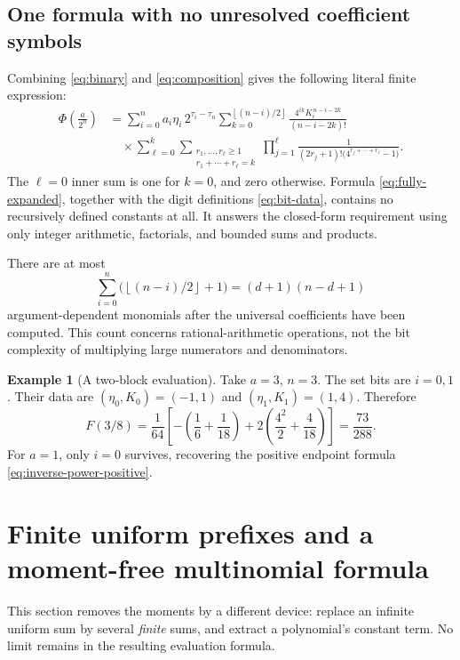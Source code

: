 \documentclass[11pt,a4paper]{article}
\theoremstyle{definition}
\newtheorem{example}[theorem]{Example}
\theoremstyle{remark}
\newcommand{\floor}[1]{\left\lfloor #1\right\rfloor}
\begin{document}
\subsection{One formula with no unresolved coefficient symbols}
Combining \eqref{eq:binary} and \eqref{eq:composition} gives the following literal
finite expression:
\begin{equation}
 \boxed{\begin{aligned}
 \Phi\!\left(\frac a{2^n}\right)
 &=\sum_{i=0}^{n}a_i\eta_i\,2^{\tau_i-\tau_n}
   \sum_{k=0}^{\floor{(n-i)/2}}
       \frac{4^{ik}K_i^{\,n-i-2k}}{(n-i-2k)!}\\[-0.1em]
 &\quad\times
   \sum_{\ell=0}^{k}
   \sum_{\substack{r_1,\ldots,r_\ell\geq1\\r_1+\cdots+r_\ell=k}}
       \prod_{j=1}^{\ell}
       \frac{1}{(2r_j+1)!\bigl(4^{r_j+\cdots+r_\ell}-1\bigr)}.
 \end{aligned}}                                               \label{eq:fully-expanded}
\end{equation}
The \(\ell=0\) inner sum is one for \(k=0\), and zero otherwise.  Formula
\eqref{eq:fully-expanded}, together with the digit definitions
\eqref{eq:bit-data}, contains no recursively defined constants at all.
It answers the closed-form requirement using only integer arithmetic, factorials,
and bounded sums and products.

There are at most
\[
 \sum_{i=0}^{n}\bigl(\floor{(n-i)/2}+1\bigr)
 =(d+1)(n-d+1)
\]
argument-dependent monomials after the universal coefficients have been computed.
This count concerns rational-arithmetic operations, not the bit complexity of
multiplying large numerators and denominators.

\begin{example}[A two-block evaluation]
Take \(a=3\), \(n=3\).  The set bits are \(i=0,1\).  Their data are
\((\eta_0,K_0)=(-1,1)\) and \((\eta_1,K_1)=(1,4)\).  Therefore
\[
 F(3/8)=\frac1{64}
   \left[-\left(\frac16+\frac1{18}\right)
     +2\left(\frac{4^2}{2}+\frac4{18}\right)\right]
 =\frac{73}{288}.
\]
For \(a=1\), only \(i=0\) survives, recovering the positive endpoint formula
\eqref{eq:inverse-power-positive}.
\end{example}

\section{Finite uniform prefixes and a moment-free multinomial formula}
\label{sec:prefix}
This section removes the moments by a different device: replace an infinite
uniform sum by several \emph{finite} sums, and extract a polynomial's constant
term.  No limit remains in the resulting evaluation formula.
\end{document}
